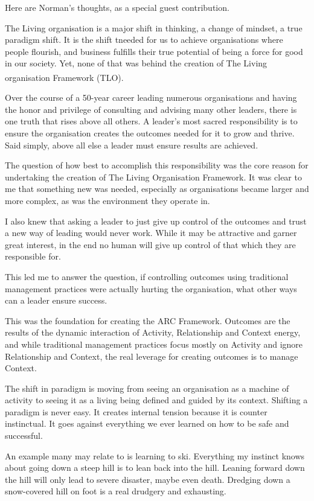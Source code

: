 Here are Norman’s thoughts, as a special guest contribution.
\begin{longstoryblock}
The Living organisation is a major shift in thinking, a change of mindset, a true paradigm shift. It is the shift tneeded for us to achieve organisations where people flourish, and business fulfills their true potential of being a force for good in our society. Yet, none of that was behind the creation of The Living organisation \textsuperscript{\textregistered} Framework (TLO). 


Over the course of a 50-year career leading numerous organisations and having the honor and privilege of consulting and advising many other leaders, there is one truth that rises above all others. A leader’s most sacred responsibility is to ensure the organisation creates the outcomes needed for it to grow and thrive. Said simply, above all else a leader must ensure results are achieved.


The question of how best to accomplish this responsibility was the core reason for undertaking the creation of The Living Organisation Framework. It was clear to me that something new was needed, especially as organisations became larger and more complex, as was the environment they operate in. 


I also knew that asking a leader to just give up control of the outcomes and trust a new way of leading would never work. While it may be attractive and garner great interest, in the end no human will give up control of that which they are responsible for.


This led me to answer the question, if controlling outcomes using traditional management practices were actually hurting the organisation, what other ways can a leader ensure success. 


This was the foundation for creating the ARC Framework.
Outcomes are the results of the dynamic interaction of Activity, Relationship and Context energy, and while traditional management practices focus mostly on Activity and ignore Relationship and Context, the real leverage for creating outcomes is to manage Context. 


The shift in paradigm is moving from seeing an organisation as a machine of activity to seeing it as a living being defined and guided by its context. Shifting a paradigm is never easy. It creates internal tension because it is counter instinctual. It
goes against everything we ever learned on how to be safe and successful.


An example many may relate to is learning to ski. Everything my instinct knows about going down a steep hill is to lean back into the hill. Leaning forward down the hill will only lead to severe disaster, maybe even death. Dredging down a snow-covered hill on foot is a real drudgery and exhausting. 



\end{longstoryblock}
